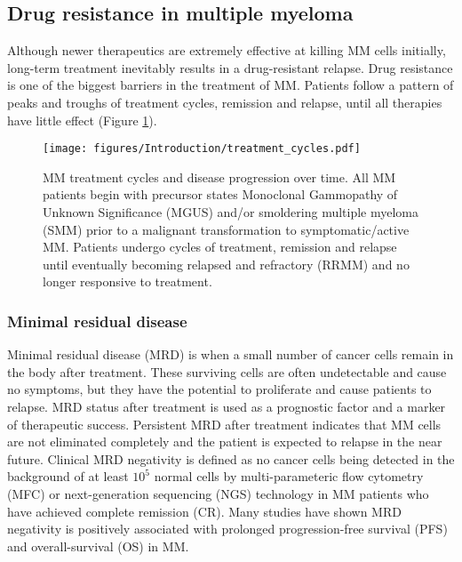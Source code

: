 \subsection{Drug resistance in multiple myeloma}
Although newer therapeutics are extremely effective at killing MM cells initially, long-term treatment inevitably results in a drug-resistant relapse.
Drug resistance is one of the biggest barriers in the treatment of MM\@.
Patients follow a pattern of peaks and troughs of treatment cycles, remission and relapse, until all therapies have little effect (Figure \ref{fig:treatment_cycles}).
\begin{figure}[htb]
\centering
\texttt{[image: figures/Introduction/treatment\_cycles.pdf]}
\caption[MM treatment cycles]{MM treatment cycles and disease progression over time.
All MM patients begin with precursor states Monoclonal Gammopathy of Unknown Significance (MGUS) and/or smoldering multiple myeloma (SMM) prior to a malignant transformation to symptomatic/active MM.
Patients undergo cycles of treatment, remission and relapse until eventually becoming relapsed and refractory (RRMM) and no longer responsive to treatment.
}
\label{fig:treatment_cycles}
\end{figure}
\subsubsection{Minimal residual disease}
Minimal residual disease (MRD) is when a small number of cancer cells remain in the body after treatment.
These surviving cells are often undetectable and cause no symptoms, but they have the potential to proliferate and cause patients to relapse.
MRD status after treatment is used as a prognostic factor and a marker of therapeutic success.
Persistent MRD after treatment indicates that MM cells are not eliminated completely and the patient is expected to relapse in the near future\cite{ding2021minimal}.
Clinical MRD negativity is defined as no cancer cells being detected in the background of at least $10^5$ normal cells by multi-parameteric flow cytometry (MFC) or next-generation sequencing (NGS) technology in MM patients who have achieved complete remission (CR)\cite{kumar2016international}.
Many studies have shown MRD negativity is positively associated with prolonged progression-free survival (PFS) and overall-survival (OS) in MM\cite{paiva2008multiparameter, martinez2014prognostic, munshi2020large}.


